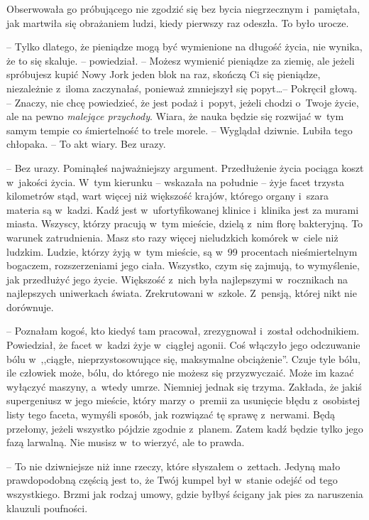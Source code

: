 \documentclass[oneside,polish,11pt,sfheadings]{mwbk}
\begin{document}
Obserwowała go próbującego nie zgodzić się bez bycia niegrzecznym i~pamiętała, jak martwiła się obrażaniem ludzi, kiedy pierwszy raz
odeszła. To było urocze.

-- Tylko dlatego, że pieniądze mogą być wymienione na długość życia, nie
wynika, że to się skaluje. -- powiedział. -- Możesz wymienić pieniądze za
ziemię, ale jeżeli spróbujesz kupić Nowy Jork jeden blok na raz, skończą
Ci się pieniądze, niezależnie z~iloma zaczynałaś, ponieważ zmniejszył
się popyt\ldots  -- Pokręcił głową. -- Znaczy, nie chcę powiedzieć, że jest
podaż i~popyt, jeżeli chodzi o~Twoje życie, ale na pewno \textit{malejące
przychody}. Wiara, że nauka będzie się rozwijać w~tym samym tempie co
śmiertelność to trele morele. -- Wyglądał dziwnie. Lubiła tego chłopaka.
-- To akt wiary. Bez urazy.

-- Bez urazy. Pominąłeś najważniejszy argument. Przedłużenie życia
pociąga koszt w~jakości życia. W~tym kierunku -- wskazała na południe -- żyje facet trzysta kilometrów stąd, wart więcej niż większość krajów,
którego organy i~szara materia są w~kadzi. Kadź jest w~ufortyfikowanej
klinice i~klinika jest za murami miasta. Wszyscy, którzy pracują w~tym
mieście, dzielą z~nim florę bakteryjną. To warunek zatrudnienia. Masz
sto razy więcej nieludzkich komórek w~ciele niż ludzkim. Ludzie, którzy
żyją w~tym mieście, są w~99 procentach nieśmiertelnym bogaczem,
rozszerzeniami jego ciała. Wszystko, czym się zajmują, to wymyślenie,
jak przedłużyć jego życie. Większość z~nich była najlepszymi w~rocznikach na najlepszych uniwerkach świata. Zrekrutowani w~szkole. Z~pensją, której nikt nie dorównuje.

-- Poznałam kogoś, kto kiedyś tam pracował, zrezygnował i~został
odchodnikiem. Powiedział, że facet w~kadzi żyje w~ciągłej agonii. Coś
włączyło jego odczuwanie bólu w~,,ciągłe, nieprzystosowujące się,
maksymalne obciążenie''. Czuje tyle bólu, ile człowiek może, bólu, do
którego nie możesz się przyzwyczaić. Może im kazać wyłączyć maszyny, a~wtedy umrze. Niemniej jednak się trzyma. Zakłada, że jakiś supergeniusz
w jego mieście, który marzy o~premii za usunięcie błędu z~osobistej
listy tego faceta, wymyśli sposób, jak rozwiązać tę sprawę z~nerwami.
Będą przełomy, jeżeli wszystko pójdzie zgodnie z~planem. Zatem kadź
będzie tylko jego fazą larwalną. Nie musisz w~to wierzyć, ale to prawda.

-- To nie dziwniejsze niż inne rzeczy, które słyszałem o~zettach. Jedyną
mało prawdopodobną częścią jest to, że Twój kumpel był w~stanie odejść od
tego wszystkiego. Brzmi jak rodzaj umowy, gdzie byłbyś ścigany jak pies
za naruszenia klauzuli poufności.
\end{document}
